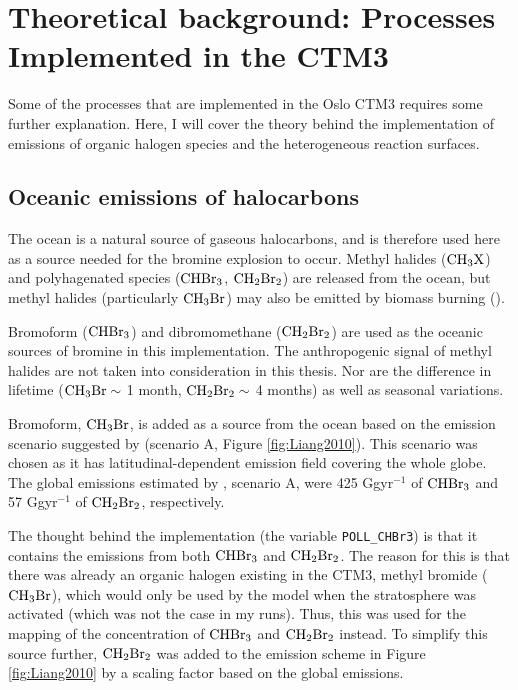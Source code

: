\setcounter{chapter}{2} 
\chapter{Theoretical background: Processes Implemented in the CTM3}\label{Chap:CTM3theory_ocean_hetReact}

Some of the processes that are implemented in the Oslo CTM3 requires some further explanation. Here, I will cover the theory behind the implementation of emissions of organic halogen species and the heterogeneous reaction surfaces.

\section{Oceanic emissions of halocarbons}\label{sec:oceanic_emissions}


The ocean is a natural source of gaseous halocarbons, and is therefore used here as a source needed for the bromine explosion to occur. Methyl halides ($\mathrm{CH_3X}$) and polyhagenated species ($\mathrm{CHBr_3}$, $\mathrm{CH_2Br_2}$) are released from the ocean, but methyl halides (particularly $\mathrm{CH_3Br}$) may also be emitted by biomass burning (\cite{SeinfeldSpyros}). 

\medskip

Bromoform ($\mathrm{CHBr_3}$) and dibromomethane ($\mathrm{CH_2Br_2}$) are used as the oceanic sources of bromine in this implementation. The anthropogenic signal of methyl halides are not taken into consideration in this thesis. Nor are the difference in lifetime ($\mathrm{CH_3Br} \sim$ 1 month, $\mathrm{CH_2Br_2} \sim$ 4 months) as well as seasonal variations. 


\medskip

Bromoform, $\mathrm{CH_3Br}$, is added as a source from the ocean based on the emission scenario suggested by \cite{Liang2010} (scenario A, Figure \ref{fig:Liang2010}). This scenario was chosen as it has latitudinal-dependent emission field covering the whole globe. The global emissions estimated by \cite{Liang2010}, scenario A, were 425 Ggyr$^{-1}$ of $\mathrm{CHBr_3}$ and 57 Ggyr$^{-1}$ of $\mathrm{CH_2Br_2}$, respectively.

\medskip

The thought behind the implementation (the variable \texttt{POLL\_CHBr3}) is that it contains the emissions from both $\mathrm{CHBr_3}$ and $\mathrm{CH_2Br_2}$. The reason for this is that there was already an organic halogen existing in the CTM3, methyl bromide ($\mathrm{CH_3Br}$), which would only be used by the model when the stratosphere was activated (which was not the case in my runs). Thus, this was used for the mapping of the concentration of $\mathrm{CHBr_3}$ and $\mathrm{CH_2Br_2}$ instead. To simplify this source further, $\mathrm{CH_2Br_2}$ was added to the emission scheme in Figure \ref{fig:Liang2010} by a scaling factor based on the global emissions. 

